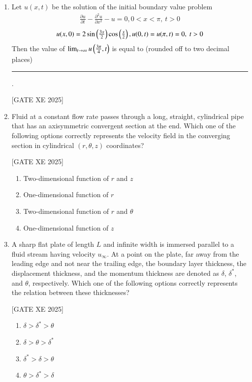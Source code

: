 \documentclass[journal,12pt,onecolumn]{IEEEtran}
\theoremstyle{remark}
\begin{document}
\begin{enumerate}
\item Let $u(x,t)$ be the solution of the initial boundary value problem  
\begin{align}
\frac{\partial u}{\partial t} - \frac{\partial^2 u}{\partial x^2} - u = 0,  0<x<\pi,\ t>0
\end{align}  
\begin{align}
u(x,0)=2\sin\left(\tfrac{3x}{2}\right)\cos\left(\tfrac{x}{2}\right), u(0,t)=u(\pi,t)=0, \ t>0
\end{align}  
Then the value of $\lim_{t\to\infty} u\left(\tfrac{3\pi}{4},t\right)$ is equal to (rounded off to two decimal places) \rule{3cm}{0.15mm}.

\hfill [GATE XE 2025]



\item Fluid at a constant flow rate passes through a long, straight, cylindrical pipe that has an axisymmetric convergent section at the end. Which one of the following options correctly represents the velocity field in the converging section in cylindrical $(r,\theta,z)$ coordinates? \label{q:22}

\hfill[GATE XE 2025]

\begin{multicols}{2}
\begin{enumerate}
\item Two-dimensional function of $r$ and $z$
\item One-dimensional function of $r$
\item Two-dimensional function of $r$ and $\theta$
\item One-dimensional function of $z$
\end{enumerate}
\end{multicols}


\item A sharp flat plate of length $L$ and infinite width is immersed parallel to a fluid stream having velocity $u_\infty$. At a point on the plate, far away from the leading edge and not near the trailing edge, the boundary layer thickness, the displacement thickness, and the momentum thickness are denoted as $\delta$, $\delta^*$, and $\theta$, respectively. Which one of the following options correctly represents the relation between these thicknesses? \label{q:23}

\hfill[GATE XE 2025]

\begin{multicols}{2}
\begin{enumerate}
\item $\delta > \delta^* > \theta$
\item $\delta > \theta > \delta^*$
\item $\delta^* > \delta > \theta$
\item $\theta > \delta^* > \delta$
\end{enumerate}
\end{multicols}



\end{enumerate}
\end{document}
